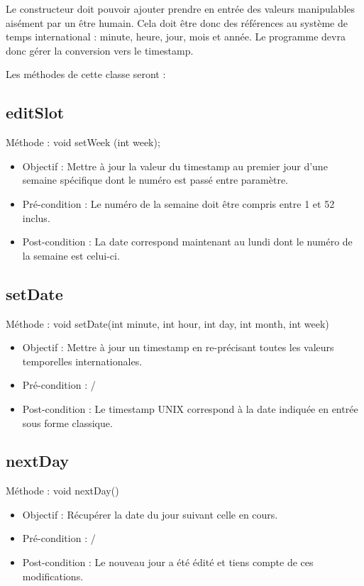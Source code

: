{        Le constructeur doit pouvoir ajouter prendre en entrée des valeurs manipulables aisément par un être humain. Cela doit être donc des références au système de temps international : minute, heure, jour, mois et année. Le programme devra donc gérer la conversion vers le timestamp.
        
        Les méthodes de cette classe seront :
   		\subsection*{editSlot}
            Méthode : void setWeek (int week);
			\begin{itemize}
				\item Objectif : Mettre à jour la valeur du timestamp au premier jour d'une semaine spécifique dont le numéro est passé entre paramètre.
				\item Pré-condition : Le numéro de la semaine doit être compris entre 1 et 52 inclus.
				\item Post-condition : La date correspond maintenant au lundi dont le numéro de la semaine est celui-ci.
			\end{itemize}
			
   		\subsection*{setDate}
            Méthode : void setDate(int minute, int hour, int day, int month, int week)
			\begin{itemize}
				\item Objectif : Mettre à jour un timestamp en re-précisant toutes les valeurs temporelles internationales.
				\item Pré-condition : /
				\item Post-condition : Le timestamp UNIX correspond à la date indiquée en entrée sous forme classique.
			\end{itemize}
			
   		\subsection*{nextDay}
            Méthode : void nextDay()
			\begin{itemize}
				\item Objectif : Récupérer la date du jour suivant celle en cours.
				\item Pré-condition : /
				\item Post-condition : Le nouveau jour a été édité et tiens compte de ces modifications.
			\end{itemize}
			
}
